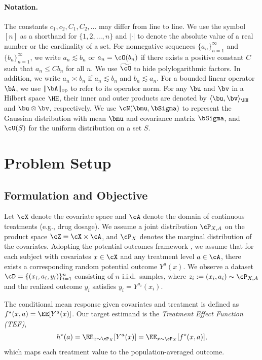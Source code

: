 \documentclass[english,11pt]{article}
\begin{document}
\paragraph{Notation.}
The constants $c_1, c_2, C_1, C_2, \dots$ may differ from line to line. We use the symbol $[n]$ as a shorthand for $\{ 1, 2, \dots, n \}$ and $| \cdot |$ to denote the absolute value of a real number or the cardinality of a set. For nonnegative sequences $\{ a_n \}_{n=1}^{\infty}$ and $\{ b_n \}_{n=1}^{\infty}$, we write $a_n \lesssim b_n$ or $a_n = \cO(b_n)$ if there exists a positive constant $C$ such that $a_n \leq C b_n$ for all $n$. We use $\widetilde{\cO}$ to hide polylogarithmic factors. In addition, we write $a_n \asymp b_n$ if $a_n \lesssim b_n$ and $b_n \lesssim a_n$. For a bounded linear operator $\bA$, we use $\| \bA \|_{\mathrm{op}}$ to refer to its operator norm. For any $\bu$ and $\bv$ in a Hilbert space $\HH$, their inner and outer products are denoted by $\langle \bu, \bv \rangle_{\HH}$ and $\bu \otimes \bv$, respectively. We use $\cN(\bmu, \bSigma)$ to represent the Gaussian distribution with mean $\bmu$ and covariance matrix $\bSigma$, and $\cU (S)$ for the uniform distribution on a set \(S\).

\section{Problem Setup}\label{section:problem-setup}

\subsection{Formulation and Objective}

Let $\cX$ denote the covariate space and $\cA$ denote the domain of continuous treatments (e.g., drug dosage).
We assume a joint distribution $\cP_{X,A}$ on the product space $\cZ = \cX \times \cA$, and $\cP_X$ denotes the marginal distribution of the covariates.
Adopting the potential outcomes framework \citep{robins2000marginal}, we assume that for each subject with covariates $x \in \cX$ and any treatment level $a \in \cA$, there exists a corresponding random potential outcome $Y^a(x)$.
We observe a dataset $\cD = \{(x_i, a_i, y_i)\}_{i=1}^n$ consisting of $n$ i.i.d.\ samples, where $z_i := (x_i, a_i) \sim \cP_{X, A}$ and the realized outcome $y_i$ satisfies $y_i = Y^{a_i}(x_i)$.

The conditional mean response given covariates and treatment is defined as $f^\star(x, a) = \EE[Y^a(x)]$. Our target estimand is the \emph{Treatment Effect Function (TEF)},
\begin{equation*}
    h^\star(a) = \EE_{x \sim \cP_X} [Y^a(x)] = \EE_{x \sim \cP_X} [f^\star(x, a)],
\end{equation*}
which maps each treatment value to the population-averaged outcome.
\end{document}
